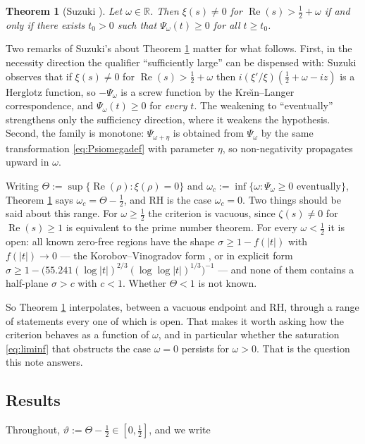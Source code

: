 \documentclass[11pt,reqno]{amsart}
\theoremstyle{plain}
\newtheorem{theorem}{Theorem}[section]
\theoremstyle{definition}
\newcommand{\R}{\mathbb{R}}
\newcommand{\Rp}{\operatorname{Re}}
\begin{document}
\begin{theorem}[{Suzuki \cite[Thm.~11.1]{Suzuki2023}}]\label{thm:suzuki}
Let $\omega\in\R$. Then $\xi(s)\neq0$ for $\Rp(s)>\tfrac12+\omega$ if and only if there exists
$t_0>0$ such that $\Psi_\omega(t)\ge0$ for all $t\ge t_0$.
\end{theorem}

Two remarks of Suzuki's about Theorem \ref{thm:suzuki} matter for what follows. First, in the
necessity direction the qualifier ``sufficiently large'' can be dispensed with: Suzuki observes
\cite[\S11]{Suzuki2023} that if $\xi(s)\neq0$ for $\Rp(s)>\tfrac12+\omega$ then
$i(\xi'/\xi)(\tfrac12+\omega-iz)$ is a Herglotz function, so $-\Psi_\omega$ is a screw function by
the Kre\u\i n--Langer correspondence, and $\Psi_\omega(t)\ge0$ for \emph{every} $t$. The weakening
to ``eventually'' strengthens only the sufficiency direction, where it weakens the hypothesis.
Second, the family is monotone: $\Psi_{\omega+\eta}$ is obtained from $\Psi_\omega$ by the same
transformation \eqref{eq:Psiomegadef} with parameter $\eta$, so non-negativity propagates upward in
$\omega$.

Writing $\Theta:=\sup\{\Rp(\rho):\xi(\rho)=0\}$ and
$\omega_c:=\inf\{\omega:\Psi_\omega\ge0\text{ eventually}\}$, Theorem \ref{thm:suzuki} says
$\omega_c=\Theta-\tfrac12$, and RH is the case $\omega_c=0$. Two things should be said about this
range. For $\omega\ge\tfrac12$ the criterion is vacuous, since $\zeta(s)\neq0$ for $\Rp(s)\ge1$ is
equivalent to the prime number theorem. For every $\omega<\tfrac12$ it is open: all known zero-free
regions have the shape $\sigma\ge1-f(|t|)$ with $f(|t|)\to0$ --- the Korobov--Vinogradov form
\cite{Ford}, or in explicit form $\sigma\ge1-\bigl(55.241(\log|t|)^{2/3}(\log\log|t|)^{1/3}\bigr)^{-1}$
\cite{MTY} --- and none of them contains a half-plane $\sigma>c$ with $c<1$. Whether $\Theta<1$ is
not known.

So Theorem \ref{thm:suzuki} interpolates, between a vacuous endpoint and RH, through a range of
statements every one of which is open. That makes it worth asking how the criterion behaves as a
function of $\omega$, and in particular whether the saturation \eqref{eq:liminf} that obstructs the
case $\omega=0$ persists for $\omega>0$. That is the question this note answers.

\subsection{Results}

Throughout, $\vartheta:=\Theta-\tfrac12\in[0,\tfrac12]$, and we write
\end{document}
